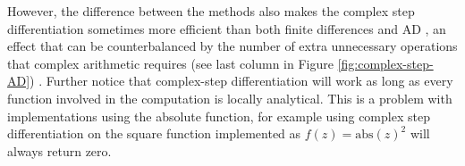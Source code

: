 However, the difference between the methods also makes the complex step differentiation sometimes more efficient than both finite differences and AD \cite{Lantoine_Russell_Dargent_2012}, an effect that can be counterbalanced by the number of extra unnecessary operations that complex arithmetic requires (see last column in Figure \ref{fig:complex-step-AD}) \cite{Martins_Sturdza_Alonso_2003_complex_differentiation}.
Further notice that complex-step differentiation will work as long as every function involved in the computation is locally analytical. 
This is a problem with implementations using the absolute function, for example using complex step differentiation on the square function implemented as $f(z) = \text{abs}(z)^2$ will always return zero.
